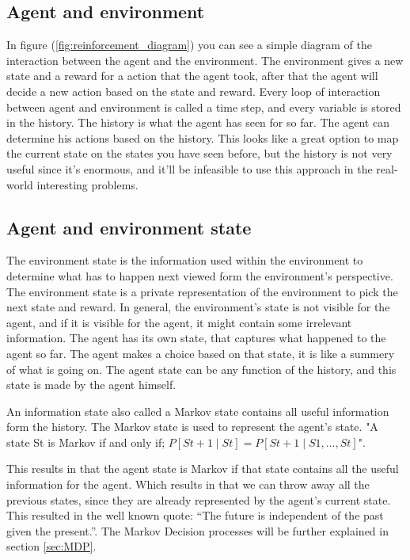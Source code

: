 \documentclass{report}
\begin{document}
\subsection{Agent and environment}
In figure (\ref{fig:reinforcement_diagram}) you can see a simple diagram of the interaction between the agent and the environment. The environment gives a new state and a reward for a action that the agent took, after that the agent will decide a new action based on the state and reward. Every loop of interaction between agent and environment is called a time step, and every variable is stored in the history. The history is what the agent has seen for so far.  The agent can determine his actions based on the history. This looks like a great option to map the current state on the states you have seen before, but the history is not very useful since it’s enormous, and it’ll be infeasible to use this approach in the real-world interesting problems.

\subsection{Agent and environment state}
The environment state is the information used within the environment to determine what has to happen next viewed form the environment’s perspective. The environment state is a private representation of the environment to pick the next state and reward. In general, the environment’s state is not visible for the agent, and if it is visible for the agent, it might contain some irrelevant information. The agent has its own state, that captures what happened to the agent so far. The agent makes a choice based on that state, it is like a summery of what is going on. The agent state can be any function of the history, and this state is made by the agent himself.

An information state also called a Markov state contains all useful information form the history. The Markov state is used to represent the agent’s state. "A state St is Markov if and only if; $P[St +1\mid St] = P[St+1 \mid S1,...,St]$"\cite{RL_intro}.

This results in that the agent state is Markov if that state contains all the useful information for the agent. Which results in that we can throw away all the previous states, since they are already represented by the agent’s current state. This resulted in the well known quote: “The future is independent of the past given the present.”. The Markov Decision processes will be further explained in section \ref{sec:MDP}.
\end{document}
